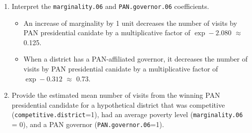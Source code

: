 \documentclass[12pt,letterpaper]{article}
\begin{document}
\begin{enumerate}
\begin{table}[!htbp]
\end{table} 
\newpage
{}
	\item [(b)]
	Interpret the \texttt{marginality.06} and \texttt{PAN.governor.06} coefficients.
	\begin{itemize}
		\item An increase of marginality by 1 unit  decreases the number of visits by PAN presidential canidate by a multiplicative factor of $\exp -2.080$ $\approx$ 0.125. 
		\item When a district has a PAN-affiliated governor, it decreases the number of visits by PAN presidential canidate by a multiplicative factor of $\exp -0.312$ $\approx$ 0.73.
	\end{itemize}
	\item [(c)]
	Provide the estimated mean number of visits from the winning PAN presidential candidate for a hypothetical district that was competitive (\texttt{competitive.district}=1), had an average poverty level (\texttt{marginality.06} = 0), and a PAN governor (\texttt{PAN.governor.06}=1).
	 
\end{enumerate}
\end{document}
